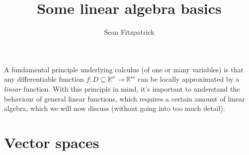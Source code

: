 \documentclass[12pt,letterpaper]{article}
\author{Sean Fitzpatrick}
\title{Some linear algebra basics}
\newcommand{\R}{\mathbb{R}}
\begin{document}
\maketitle

A fundamental principle underlying calculus (of one or many variables) is that any differentiable function $f:D\subseteq \R^n\to \R^m$ can be locally approximated by a {\em linear} function. With this principle in mind, it's important to understand the behaviour of general linear functions, which requires a certain amount of linear algebra, which we will now discuss (without going into too much detail).

\section{Vector spaces}
\end{document}
